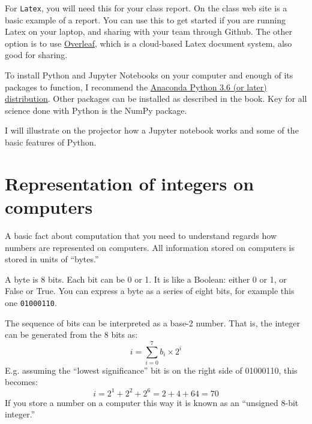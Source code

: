 For {\tt Latex}, you will need this for your class report. On the
class web site is a basic example of a report. You can use this to get
started if you are running Latex on your laptop, and sharing with your
team through Github. The other option is to use
\href{http://overleaf.com}{\color{red} Overleaf}, which is a
cloud-based Latex document system, also good for sharing.

To install Python and Jupyter Notebooks on your computer and enough of
its packages to function, I recommend the
\href{https://www.continuum.io/downloads}{\color{red} Anaconda Python
  3.6 (or later) distribution}. Other packages can be installed as
described in the book. Key for all science done with Python is the
NumPy package.

I will illustrate on the projector how a Jupyter notebook works and
some of the basic features of Python.

\section{Representation of integers on computers}

A basic fact about computation that you need to understand regards how
numbers are represented on computers. All information stored on
computers is stored in units of ``bytes.''


\begin{answer}
  A byte is 8 bits. Each bit can be 0 or 1. It is like a Boolean:
  either 0 or 1, or False or True. You can express a byte as a series
  of eight bits, for example this one {\tt 01000110}.
\end{answer}


\begin{answer}
  The sequence of bits can be interpreted as a base-2 number. That is,
  the integer can be generated from the 8 bits as:
\begin{equation}
i = \sum_{i=0}^7 b_i \times 2^i
\end{equation}
E.g. assuming the ``lowest significance'' bit is on the right side of
01000110, this becomes:
\begin{equation}
i = 2^1 + 2^2 + 2^6 = 2 + 4 + 64 = 70
\end{equation}
If you store a number on a computer this way it is known as an
``unsigned 8-bit integer.''
\end{answer}

